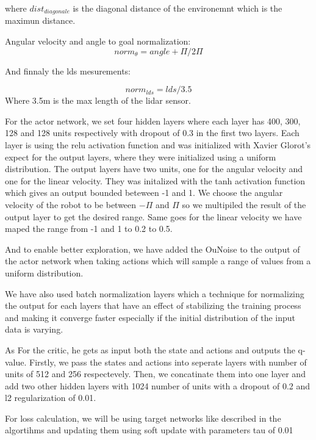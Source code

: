 \documentclass[12pt]{extarticle}
\begin{document}
where $dist_{diagonale}$ is the diagonal distance of the environemnt which is the maximun distance.

Angular velocity and angle to goal normalization:
\begin{equation} \label{angle_norm}
     norm_\theta=angle+\Pi/2\Pi
   \end{equation}

And finnaly the lds mesurements:

 \begin{equation} \label{angle_norm}
     norm_{lds}=lds/3.5 
   \end{equation}
  Where 3.5m is the max length of the lidar sensor.
   
For the actor network, we set four hidden layers where each layer has 400, 300, 128 and 128 units respectively with dropout of 0.3 in the first two layers. Each layer is using the relu activation function and was initialized with Xavier Glorot's expect for the output layers, where they were initialized using a uniform distribution. The output layers have two units, one for the angular velocity and one for the linear velocity. They was initalized with the tanh activation function which gives an output bounded beteween -1 and 1. We choose the angular velocity of  the robot to be between $-\Pi$ and $\Pi$ so we multipiled the result of the output layer to get the desired range. Same goes for the linear velocity we have maped the range from -1 and 1 to 0.2 to 0.5. 

And to enable better exploration, we have added the OuNoise to the output of the actor network when taking actions which will sample a range of values from a uniform distribution.


We have also used batch normalization layers \cite{ioffe2015batch} which a  technique for normalizing the output for each layers that have an effect of stabilizing the training process and making it converge faster especially if the initial distribution of the input data is varying.

As For the critic, he gets as input  both the state and actions and outputs the q-value. Firstly, we pass the states and actions into seperate layers 
with number of units of 512 and 256 respectevely. Then, we concatinate them into one layer and add two other hidden layers with 1024 number of units with a dropout of 0.2 and l2 regularization of 0.01.

For loss calculation, we will be using target networks like described in the algortihms and updating them using soft update with parameters tau of 0.01
\end{document}
